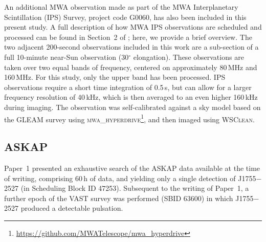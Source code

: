 \documentclass[fleqn,usenatbib]{mnras}
\newcommand{\src}{J1755$-$2527}
\begin{document}


An additional MWA observation made as part of the MWA Interplanetary Scintillation (IPS) Survey, project code G0060, has also been included in this present study. 
A full description of how MWA IPS observations are scheduled and processed can be found in Section~2 of \citet{Morgan2022}; here, we provide a brief overview.
The two adjacent 200-second observations included in this work are a sub-section of a full 10-minute near-Sun observation (30$^{\circ}$ elongation).
These observations are taken over two equal bands of frequency, centered on approximately 80\,MHz and 160\,MHz. For this study, only the upper band has been processed. 
IPS observations require a short time integration of 0.5\,s, but can allow for a larger frequency resolution of 40\,kHz, which is then averaged to an even higher 160\,kHz during imaging. %
The observation was self-calibrated against a sky model based on the GLEAM survey \citep{Hurley-Walker2017} using \textsc{mwa\_hyperdrive}\footnote{\url{https://github.com/MWATelescope/mwa_hyperdrive}}, and then imaged using \textsc{WSClean}.




\subsection{ASKAP} \label{sec:askap}


Paper~1 presented an exhaustive search of the ASKAP data available at the time of writing, comprising 60\,h of data, and yielding only a single detection of \src{} (in Scheduling Block ID 47253). Subsequent to the writing of Paper~1, a further epoch of the VAST survey was performed (SBID 63600) in which \src{} produced a detectable pulsation.
\end{document}
